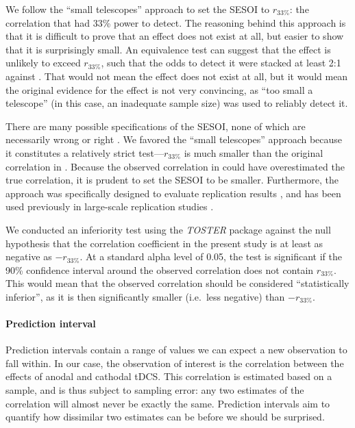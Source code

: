 \documentclass[11pt,english,]{memoir}
\let\oldparagraph\paragraph
\renewcommand{\paragraph}[1]{\oldparagraph{#1}\mbox{}}
\begin{document}
We follow the ``small telescopes'' \autocite{Simonsohn2015} approach to set the SESOI to \(r_{33\%}\): the correlation that \textcite{London2015} had 33\% power to detect. The reasoning behind this approach is that it is difficult to prove that an effect does not exist at all, but easier to show that it is surprisingly small. An equivalence test can suggest that the effect is unlikely to exceed \(r_{33\%}\), such that the odds to detect it were stacked at least 2:1 against \textcite{London2015}. That would not mean the effect does not exist at all, but it would mean the original evidence for the effect is not very convincing, as ``too small a telescope'' (in this case, an inadequate sample size) was used to reliably detect it.

There are many possible specifications of the SESOI, none of which are necessarily wrong or right \autocite{Lakens2018}. We favored the ``small telescopes'' approach because it constitutes a relatively strict test---\(r_{33\%}\) is much smaller than the original correlation in \textcite{London2015}. Because the observed correlation in \textcite{London2015} could have overestimated the true correlation, it is prudent to set the SESOI to be smaller. Furthermore, the approach was specifically designed to evaluate replication results \autocite{Simonsohn2015}, and has been used previously in large-scale replication studies \autocite[e.g.][]{Camerer2018}.

We conducted an inferiority test using the \emph{TOSTER} package \autocite[Version NA;][]{R-TOSTER} against the null hypothesis that the correlation coefficient in the present study is at least as negative as \(-r_{33\%}\). At a standard alpha level of 0.05, the test is significant if the 90\% confidence interval around the observed correlation does not contain \(r_{33\%}\). This would mean that the observed correlation should be considered ``statistically inferior'', as it is then significantly smaller (i.e.~less negative) than \(-r_{33\%}\).

\hypertarget{pi}{%
\paragraph{Prediction interval}\label{pi}}

Prediction intervals contain a range of values we can expect a new observation to fall within. In our case, the observation of interest is the correlation between the effects of anodal and cathodal tDCS. This correlation is estimated based on a sample, and is thus subject to sampling error: any two estimates of the correlation will almost never be exactly the same. Prediction intervals aim to quantify how dissimilar two estimates can be before we should be surprised.
\end{document}
